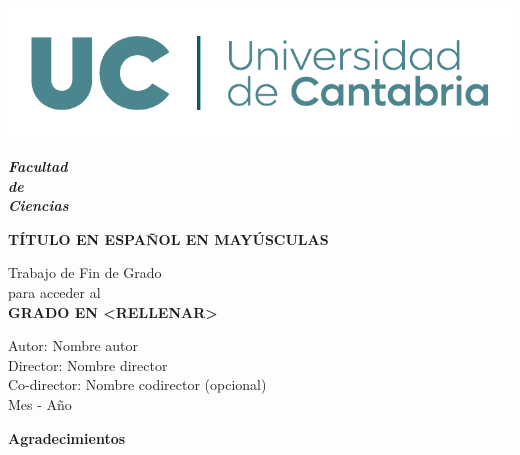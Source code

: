 \documentclass{article}
\begin{document}
	\begin{titlepage}
		{\selectfont
			\begin{center}
				\vspace*{-2.5cm}
				
				\includegraphics[width=\linewidth]{images/logoUC.pdf}
				
				\vspace{0.5cm}
				\textbf{\Huge\emph{Facultad \\
						de\\
						Ciencias}}
				
				\vspace{1cm}
				\textbf{\fontsize{20}{24}\selectfont TÍTULO EN ESPAÑOL EN MAYÚSCULAS}\\
				\fontsize{19}{24}\selectfont {(Título en inglés en minúsculas entre paréntesis)}
				
				\vspace{1.5cm}
				\fontsize{14}{17}\selectfont Trabajo de Fin de Grado\\
				para acceder al\\
                \vspace{0.5cm}
				\textbf{\fontsize{17}{20}\selectfont GRADO EN <RELLENAR>}
				
				\vfill
				
				
				\vspace{0.8cm}
				
				
				\begin{flushright}
					\fontsize{14}{17}
					Autor: Nombre autor\\
					Director: Nombre director\\
					Co-director: Nombre codirector (opcional)\\
					Mes - Año
				\end{flushright}
				
				
		\end{center}}
	\end{titlepage}


\newpage
\begin{center}
{\bf \Huge Agradecimientos}
\end{center}
\vspace{1cm}
\setlength{\baselineskip}{0.8cm}
\onehalfspacing
\begin{flushleft}



\end{flushleft}
\end{document}

